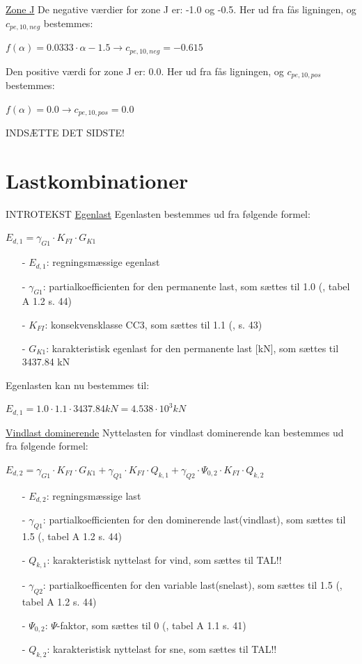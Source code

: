 \underline{Zone J}
\newline
De negative værdier for zone J er: -1.0 og -0.5. Her ud fra fås ligningen, og $c_{pe,10,neg}$ bestemmes:
\begin{center}
	$f(\alpha)=0.0333\cdot \alpha - 1.5 \to c_{pe,10,neg}=-0.615$
\end{center}
Den positive værdi for zone J er: 0.0. Her ud fra fås ligningen, og $c_{pe,10,pos}$ bestemmes:
\begin{center}
	$f(\alpha)=0.0 \to c_{pe,10,pos}=0.0$
\end{center}
INDSÆTTE DET SIDSTE!

\section{Lastkombinationer}
INTROTEKST
\newline
\newline
\underline{Egenlast}
\newline
Egenlasten bestemmes ud fra følgende formel:
\begin{center}
	$E_{d,1}=\gamma_{G1}\cdot K_{FI}\cdot G_{K1}$
\end{center}
\begin{itemize}
	\item[-] $E_{d,1}$: regningsmæssige egenlast
	\item[-] $\gamma_{G1}$: partialkoefficienten for den permanente last, som sættes til 1.0 (\citep{EU90}, tabel A 1.2 s. 44)
	\item[-] $K_{FI}$: konsekvensklasse CC3, som sættes til 1.1 (\citep{EU90}, s. 43)
	\item[-] $G_{K1}$: karakteristisk egenlast for den permanente last [kN], som sættes til 3437.84 kN
\end{itemize}
Egenlasten kan nu bestemmes til:
\begin{center}
	$E_{d,1}=1.0\cdot 1.1\cdot 3437.84 kN=4.538\cdot 10^3 kN$
\end{center}
\underline{Vindlast dominerende}
\newline
Nyttelasten for vindlast dominerende kan bestemmes ud fra følgende formel:
\begin{center}
	$E_{d,2}=\gamma_{G1}\cdot K_{FI}\cdot G_{K1}+\gamma_{Q1}\cdot K_{FI}\cdot Q_{k,1}+\gamma_{Q2}\cdot \Psi_{0,2}\cdot K_{FI}\cdot Q_{k,2}$
\end{center}
\begin{itemize}
	\item[-] $E_{d,2}$: regningsmæssige last
	\item[-] $\gamma_{Q1}$: partialkoefficienten for den dominerende last(vindlast), som sættes til 1.5 (\citep{EU90}, tabel A 1.2 s. 44)
	\item[-] $Q_{k,1}$: karakteristisk nyttelast for vind, som sættes til TAL!!
	\item[-] $\gamma_{Q2}$: partialkoefficenten for den variable last(snelast), som sættes til 1.5 (\citep{EU90}, tabel A 1.2 s. 44)
	\item[-] $\Psi_{0,2}$: $\Psi$-faktor, som sættes til 0 (\citep{EU90}, tabel A 1.1 s. 41)
	\item[-] $Q_{k,2}$: karakteristisk nyttelast for sne, som sættes til TAL!!
\end{itemize}
